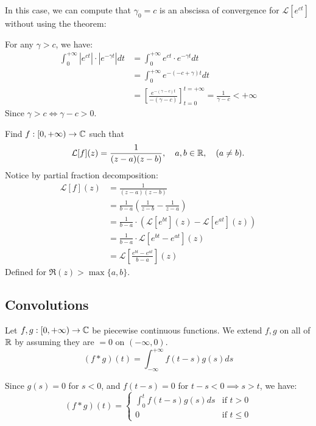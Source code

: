 \begin{remark}[Remark]
    In this case, we can compute that $\gamma_0 = c$ is an abscissa of convergence for $\mathcal{L}[e^{ct}]$ without using the theorem:
    
    For any $\gamma > c$, we have:
    \begin{align*}
        \int_{0}^{+\infty} |e^{ct}| \cdot |e^{-\gamma t}| dt &= \int_{0}^{+\infty} e^{ct} \cdot e^{-\gamma t} dt \\
        &= \int_{0}^{+\infty} e^{-(-c+\gamma)t} dt \\
        &= \left[ \frac{e^{-(\gamma-c)t}}{-(\gamma-c)} \right]_{t=0}^{t=+\infty} = \frac{1}{\gamma-c} < +\infty
    \end{align*}
    Since $\gamma > c \iff \gamma - c > 0$.
\end{remark}

\begin{example}[Example]
    Find $f: [0, +\infty) \to \mathbb{C}$ such that
    \[
        \mathcal{L}[f](z) = \frac{1}{(z-a)(z-b)}, \quad a, b \in \mathbb{R}, \quad (a \neq b).
    \]
    Notice by partial fraction decomposition: 
    \begin{align*}
        \mathcal{L}[f](z) &= \frac{1}{(z-a)(z-b)} \\
        &= \frac{1}{b-a} \left( \frac{1}{z-b} - \frac{1}{z-a} \right) \\
        &= \frac{1}{b-a} \cdot \left( \mathcal{L}[e^{bt}](z) - \mathcal{L}[e^{at}](z) \right) \\
        &= \frac{1}{b-a} \cdot \mathcal{L}[e^{bt} - e^{at}](z) \\
        &= \mathcal{L}\left[ \frac{e^{bt} - e^{at}}{b-a} \right](z)
    \end{align*}
    Defined for $\Re(z) > \max\{a, b\}$.
\end{example}

\subsection{Convolutions}

Let $f, g: [0, +\infty) \to \mathbb{C}$ be piecewise continuous functions. We extend $f, g$ on all of $\mathbb{R}$ by assuming they are $= 0$ on $(-\infty, 0)$.
\[
    (f * g)(t) = \int_{-\infty}^{+\infty} f(t-s)g(s) ds
\]

Since $g(s) = 0$ for $s < 0$, and $f(t-s) = 0$ for $t-s < 0 \implies s > t$, we have:
\[
    (f * g)(t) = 
    \begin{cases}
        \int_{0}^{t} f(t-s)g(s) ds & \text{if } t > 0 \\
        0 & \text{if } t \le 0
    \end{cases}
\]

